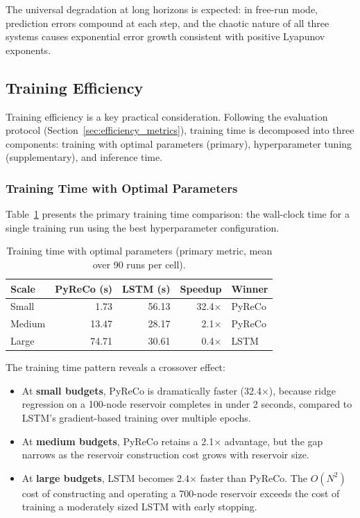 The universal degradation at long horizons is expected: in free-run mode, prediction errors compound at each step, and the chaotic nature of all three systems causes exponential error growth consistent with positive Lyapunov exponents.

\subsection{Training Efficiency}
\label{sec:train_eff}

Training efficiency is a key practical consideration. Following the evaluation protocol (Section~\ref{sec:efficiency_metrics}), training time is decomposed into three components: training with optimal parameters (primary), hyperparameter tuning (supplementary), and inference time.

\subsubsection{Training Time with Optimal Parameters}

Table~\ref{tab:training_time} presents the primary training time comparison: the wall-clock time for a single training run using the best hyperparameter configuration.

\begin{table}[H]
\centering
\caption{Training time with optimal parameters (primary metric, mean over 90 runs per cell).}
\label{tab:training_time}
\begin{tabular}{@{}lrrrl@{}}
\toprule
Scale & PyReCo (s) & LSTM (s) & Speedup & Winner \\
\midrule
Small  & 1.73  & 56.13 & 32.4$\times$ & PyReCo \\
Medium & 13.47 & 28.17 & 2.1$\times$  & PyReCo \\
Large  & 74.71 & 30.61 & 0.4$\times$  & LSTM \\
\bottomrule
\end{tabular}
\end{table}

The training time pattern reveals a crossover effect:

\begin{itemize}
    \item At \textbf{small budgets}, PyReCo is dramatically faster (32.4$\times$), because ridge regression on a 100-node reservoir completes in under 2 seconds, compared to LSTM's gradient-based training over multiple epochs.
    \item At \textbf{medium budgets}, PyReCo retains a 2.1$\times$ advantage, but the gap narrows as the reservoir construction cost grows with reservoir size.
    \item At \textbf{large budgets}, LSTM becomes 2.4$\times$ faster than PyReCo. The $O(N^2)$ cost of constructing and operating a 700-node reservoir exceeds the cost of training a moderately sized LSTM with early stopping.
\end{itemize}

